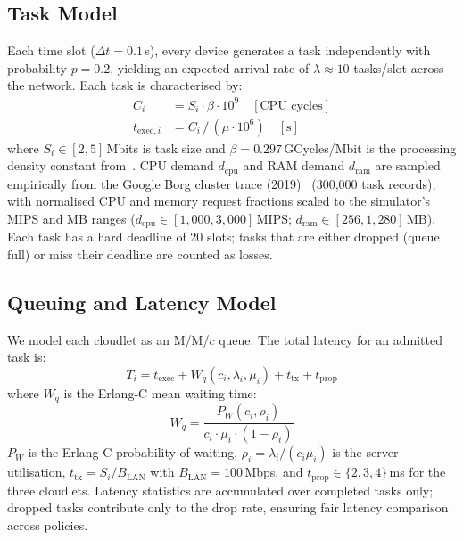 \documentclass[conference]{IEEEtran}
\begin{document}
\subsection{Task Model}

Each time slot ($\Delta t = 0.1$\,s), every device generates a task
independently with probability $p = 0.2$, yielding an expected arrival
rate of $\lambda \approx 10$ tasks/slot across the network. Each task is
characterised by:
\begin{align}
    C_i &= S_i \cdot \beta \cdot 10^9 \quad [\text{CPU cycles}] \label{eq:cycles}\\
    t_{\text{exec},i} &= C_i \,/\, (\mu \cdot 10^6) \quad [\text{s}] \label{eq:texec}
\end{align}
where $S_i \in [2, 5]$\,Mbits is task size and $\beta = 0.297$\,GCycles/Mbit
is the processing density constant from~\cite{aicdqn2026}. CPU demand $d_{\text{cpu}}$ and RAM demand $d_{\text{ram}}$ are sampled
empirically from the Google Borg cluster trace (2019)~\cite{googlecluster2019}
(300{,}000 task records), with normalised CPU and memory request fractions
scaled to the simulator's MIPS and MB ranges
($d_{\text{cpu}} \in [1{,}000, 3{,}000]$\,MIPS;
$d_{\text{ram}} \in [256, 1{,}280]$\,MB). Each task has a hard deadline of 20 slots; tasks that are
either dropped (queue full) or miss their deadline are counted as losses.

\subsection{Queuing and Latency Model}

We model each cloudlet as an M/M/$c$ queue. The total latency for an
admitted task is:
\begin{equation}
T_i = t_{\text{exec}} + W_q(c_i, \lambda_i, \mu_i) + t_{\text{tx}} + t_{\text{prop}}
\label{eq:latency}
\end{equation}
where $W_q$ is the Erlang-C mean waiting time:
\begin{equation}
W_q = \frac{P_W(c_i, \rho_i)}{c_i \cdot \mu_i \cdot (1 - \rho_i)}
\label{eq:erlangc}
\end{equation}
$P_W$ is the Erlang-C probability of waiting, $\rho_i = \lambda_i / (c_i \mu_i)$
is the server utilisation, $t_{\text{tx}} = S_i / B_{\text{LAN}}$ with
$B_{\text{LAN}} = 100$\,Mbps, and $t_{\text{prop}} \in \{2, 3, 4\}$\,ms
for the three cloudlets. Latency statistics are accumulated over completed tasks only; dropped tasks
contribute only to the drop rate, ensuring fair latency comparison across policies.
\end{document}
